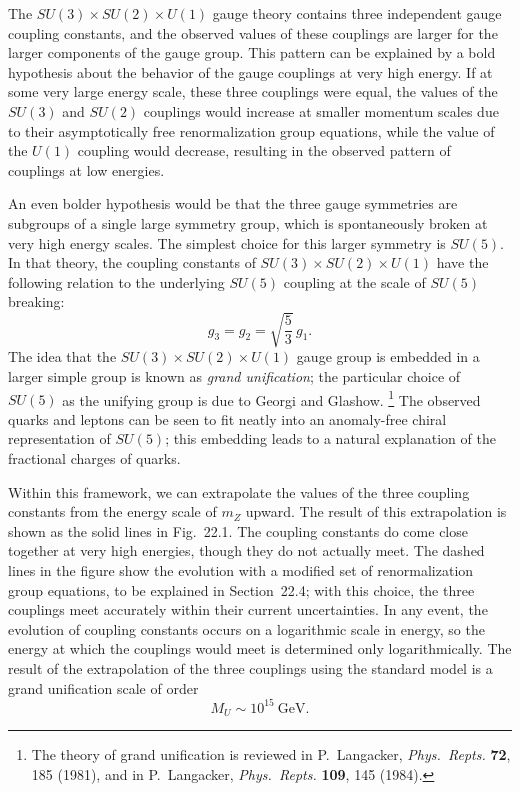 The $SU(3)\times SU(2)\times U(1)$ gauge theory contains three independent
gauge coupling constants, and the observed values of these couplings are
larger for the larger components of the gauge group.  This pattern can be
explained by a bold hypothesis about the behavior of the gauge couplings at
very high energy.  If at some very large energy scale, these three couplings
were equal, the values of the $SU(3)$ and $SU(2)$ couplings would increase at
smaller momentum scales due to their asymptotically free renormalization
group equations, while the value of the $U(1)$ coupling would decrease,
resulting in the observed pattern of couplings at low energies.

An even bolder hypothesis would be that the three gauge symmetries are
subgroups of a single large symmetry group, which is spontaneously broken at
very high energy scales.  The simplest choice for this larger symmetry is
$SU(5)$.  In that theory, the coupling constants of $SU(3)\times SU(2)\times
U(1)$ have the following relation to the underlying $SU(5)$ coupling at the
scale of $SU(5)$ breaking:
\begin{equation}
  g_3 = g_2 = \sqrt{\frac{5}{3}}\,g_1 .
  \label{eq:22.6}
\end{equation}
The idea that the $SU(3)\times SU(2)\times U(1)$ gauge group is embedded in a
larger simple group is known as \emph{grand unification}; the particular
choice of $SU(5)$ as the unifying group is due to Georgi and Glashow.%
\footnote{The theory of grand unification is reviewed in P.~Langacker,
\emph{Phys.\ Repts.} \textbf{72}, 185 (1981), and in P.~Langacker,
\emph{Phys.\ Repts.} \textbf{109}, 145 (1984).}  The observed quarks and
leptons can be seen to fit neatly into an anomaly-free chiral representation
of $SU(5)$; this embedding leads to a natural explanation of the fractional
charges of quarks.%

Within this framework, we can extrapolate the values of the three coupling
constants from the energy scale of $m_Z$ upward.  The result of this
extrapolation is shown as the solid lines in Fig.~22.1.  The
coupling constants do come close together at very high energies, though they
do not actually meet.  The dashed lines in the figure show the evolution with
a modified set of renormalization group equations, to be explained in
Section~22.4; with this choice, the three couplings meet accurately within
their current uncertainties.  In any event, the evolution of coupling
constants occurs on a logarithmic scale in energy, so the energy at which the
couplings would meet is determined only logarithmically.  The result of the
extrapolation of the three couplings using the standard model is a grand
unification scale of order
\begin{equation}
  M_U \sim 10^{15}\ \mathrm{GeV} .
\end{equation}

